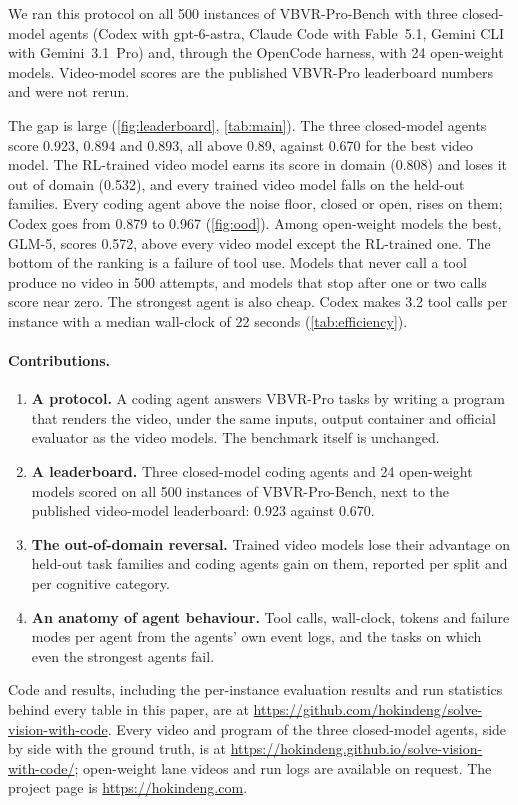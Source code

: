 We ran this protocol on all 500 instances of VBVR-Pro-Bench with three closed-model agents (Codex with gpt-6-astra, Claude Code with Fable~5.1, Gemini CLI with Gemini~3.1~Pro) and, through the OpenCode harness, with 24 open-weight models. Video-model scores are the published VBVR-Pro leaderboard numbers and were not rerun.

The gap is large (\cref{fig:leaderboard}, \cref{tab:main}). The three closed-model agents score 0.923, 0.894 and 0.893, all above 0.89, against 0.670 for the best video model. The RL-trained video model earns its score in domain (0.808) and loses it out of domain (0.532), and every trained video model falls on the held-out families. Every coding agent above the noise floor, closed or open, rises on them; Codex goes from 0.879 to 0.967 (\cref{fig:ood}). Among open-weight models the best, GLM-5, scores 0.572, above every video model except the RL-trained one. The bottom of the ranking is a failure of tool use. Models that never call a tool produce no video in 500 attempts, and models that stop after one or two calls score near zero. The strongest agent is also cheap. Codex makes 3.2 tool calls per instance with a median wall-clock of 22 seconds (\cref{tab:efficiency}).

\paragraph{Contributions.}
\begin{enumerate}[leftmargin=*,itemsep=2pt,topsep=2pt]
\item \textbf{A protocol.} A coding agent answers VBVR-Pro tasks by writing a program that renders the video, under the same inputs, output container and official evaluator as the video models. The benchmark itself is unchanged.
\item \textbf{A leaderboard.} Three closed-model coding agents and 24 open-weight models scored on all 500 instances of VBVR-Pro-Bench, next to the published video-model leaderboard: 0.923 against 0.670.
\item \textbf{The out-of-domain reversal.} Trained video models lose their advantage on held-out task families and coding agents gain on them, reported per split and per cognitive category.
\item \textbf{An anatomy of agent behaviour.} Tool calls, wall-clock, tokens and failure modes per agent from the agents' own event logs, and the tasks on which even the strongest agents fail.
\end{enumerate}

Code and results, including the per-instance evaluation results and run statistics behind every table in this paper, are at \url{https://github.com/hokindeng/solve-vision-with-code}. Every video and program of the three closed-model agents, side by side with the ground truth, is at \url{https://hokindeng.github.io/solve-vision-with-code/}; open-weight lane videos and run logs are available on request. The project page is \url{https://hokindeng.com}.
